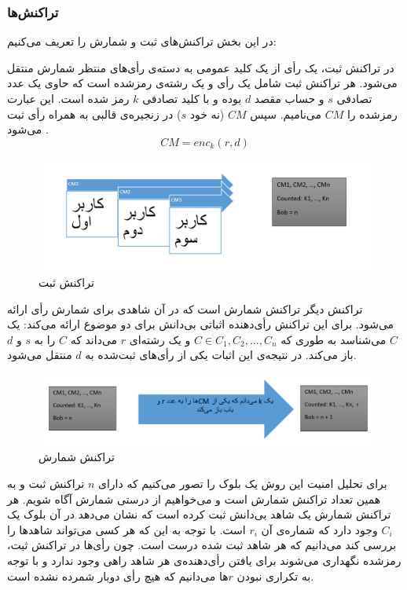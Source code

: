 \subsubsection{تراکنش‌ها}
در این بخش تراکنش‌های ثبت و شمارش را تعریف می‌کنیم:
\par
در تراکنش ثبت، یک رأی از یک کلید عمومی به دسته‌ی رأی‌های منتظر شمارش منتقل می‌شود. هر تراکنش ثبت شامل یک رأی و یک رشته‌ی 
رمزشده است که حاوی یک عدد تصادفی $s$ و حساب مقصد $d$ بوده و با کلید تصادفی $k$ رمز شده است. این عبارت رمز‌شده را $CM$ می‌نامیم. سپس $CM$ (نه خود $s$) در زنجیره‌ی قالبی به همراه رأی ثبت می‌شود
.
\\
\begin{equation}
CM = enc_{k} (r, d)
\label{eq:enc}
\end{equation}

\begin{figure}[h!]
	\centering
	\includegraphics[width=1\linewidth]{commit.PNG}
	\caption {تراکنش ثبت}
	\label{fig:commit}
\end{figure}

\par
تراکنش دیگر تراکنش شمارش است که در آن شاهدی برای شمارش رأی ارائه می‌شود. برای این تراکنش رأی‌دهنده اثباتی بی‌دانش برای دو موضوع ارائه می‌کند: یک $C$ می‌شناسد به طوری که  $C \in C_1, C_2, ... ,C_n$ و یک رشته‌ای $r$ می‌داند که $C$ را به $s$ و $d$ باز می‌کند. در نتیجه‌ی این اثبات یکی از رأی‌های ثبت‌شده به $d$ منتقل می‌شود. 

\begin{figure}[t]
	\centering
	\includegraphics[width=1\linewidth]{Count.PNG}
	\caption {تراکنش شمارش}
	\label{fig:count}
	\end{figure}
\par
برای تحلیل امنیت این روش یک بلوک را تصور می‌کنیم که دارای $n$ تراکنش ثبت و به همین تعداد تراکنش شمارش است و می‌خواهیم از درستی شمارش آگاه شویم. هر تراکنش شمارش یک شاهد بی‌دانش ثبت کرده است که نشان می‌دهد در آن بلوک یک $C_i$ وجود دارد که شماره‌ی آن $r_i$ است. با توجه به این که هر کسی می‌تواند شاهد‌ها را بررسی کند می‌دانیم که هر شاهد ثبت شده درست است. چون رأی‌‌ها در تراکنش ثبت، رمزشده نگهداری می‌شوند برای یافتن رأی‌دهنده‌ی هر شاهد راهی وجود ندارد و با توجه به تکراری نبودن $r$ها می‌دانیم که هیچ رأی دوبار شمرده نشده است. 

